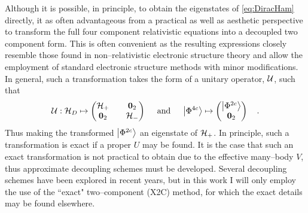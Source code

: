 Although it is possible, in principle, to obtain the eigenstates of
\cref{eq:DiracHam} directly, it as often advantageous from a practical as well
as aesthetic perspective to transform the full four component relativistic
equations into a decoupled two component form. This is often convenient as the
resulting expressions closely resemble those found in non--relativistic
electronic structure theory and allow the employment of standard electronic
structure methods with minor modifications. In general, such a transformation
takes the form of a unitary operator, $\mathcal{U}$, such that
\begin{equation}
\mathcal{U}: 
\mathcal{H}_D \mapsto \begin{pmatrix}
\mathcal{H}_+ && \boldsymbol{0}_2 \\ \boldsymbol{0}_2 && \mathcal{H}_- 
\end{pmatrix} \quad \text{ and } \quad
\left\vert \Phi^{4c} \right\rangle \mapsto \begin{pmatrix}
 \left\vert \Phi^{2c} \right\rangle \\ \boldsymbol{0}_2
\end{pmatrix} \quad.
\end{equation}
Thus making the transformed $\left\vert \Phi^{2c} \right\rangle$ an eigenstate of $\mathcal{H}_+$.  In
principle, such a transformation is exact if a proper $U$ may be found. It is
the case that such an exact transformation is not practical to obtain due to the
effective many--body $V$, thus approximate decoupling schemes must be developed.
Several decoupling schemes have been explored in recent years, but in this work
I will only employ the use of the ``exact" two--component (X2C) method, for
which the exact details may be found elsewhere.

